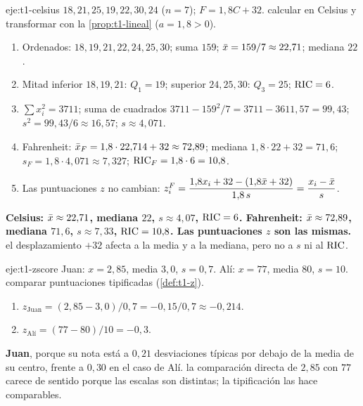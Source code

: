 \begin{solucion}{eje:t1-celsius}
\datos $18,21,25,19,22,30,24$ ($n=7$); $F=1{,}8C+32$.
\planteamiento calcular en Celsius y transformar con la \cref{prop:t1-lineal} ($a=1{,}8>0$).
\pasos
\begin{enumerate}[label=\arabic*.]
  \item Ordenados: $18,19,21,22,24,25,30$; suma $159$; $\bar{x}=159/7\approx22{,}71$; mediana $22$.
  \item Mitad inferior $18,19,21$: $Q_1=19$; superior $24,25,30$: $Q_3=25$; $\operatorname{RIC}=6$.
  \item $\sum x_i^{2}=3711$; suma de cuadrados $3711-159^{2}/7=3711-3611{,}57=99{,}43$; $s^{2}=99{,}43/6\approx16{,}57$; $s\approx4{,}071$.
  \item Fahrenheit: $\bar{x}_F=1{,}8\cdot22{,}714+32\approx72{,}89$; mediana $1{,}8\cdot22+32=71{,}6$; $s_F=1{,}8\cdot4{,}071\approx7{,}327$; $\operatorname{RIC}_F=1{,}8\cdot6=10{,}8$.
  \item Las puntuaciones $z$ no cambian: $z_i^{F}=\dfrac{1{,}8x_i+32-(1{,}8\bar{x}+32)}{1{,}8\,s}=\dfrac{x_i-\bar{x}}{s}$.
\end{enumerate}
\resultado \textbf{Celsius: $\bar{x}\approx22{,}71$, mediana $22$, $s\approx4{,}07$, $\operatorname{RIC}=6$. Fahrenheit: $\bar{x}\approx72{,}89$, mediana $71{,}6$, $s\approx7{,}33$, $\operatorname{RIC}=10{,}8$. Las puntuaciones $z$ son las mismas.}
\comprobacion el desplazamiento $+32$ afecta a la media y a la mediana, pero no a $s$ ni al $\operatorname{RIC}$.
\end{solucion}

\begin{solucion}{eje:t1-zscore}
\datos Juan: $x=2{,}85$, media $3{,}0$, $s=0{,}7$. Alí: $x=77$, media $80$, $s=10$.
\planteamiento comparar puntuaciones tipificadas (\cref{def:t1-z}).
\pasos
\begin{enumerate}[label=\arabic*.]
  \item $z_{\text{Juan}}=(2{,}85-3{,}0)/0{,}7=-0{,}15/0{,}7\approx-0{,}214$.
  \item $z_{\text{Alí}}=(77-80)/10=-0{,}3$.
\end{enumerate}
\resultado \textbf{Juan}, porque su nota está a $0{,}21$ desviaciones típicas por debajo de la media de su centro, frente a $0{,}30$ en el caso de Alí.
\comprobacion la comparación directa de $2{,}85$ con $77$ carece de sentido porque las escalas son distintas; la tipificación las hace comparables.
\end{solucion}

